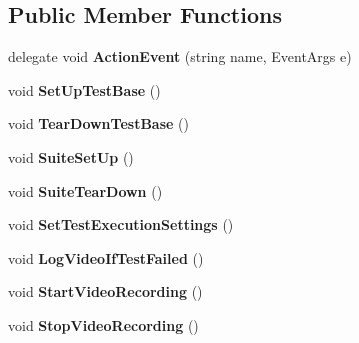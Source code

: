 \subsection*{Public Member Functions}
\begin{DoxyCompactItemize}
\item 
\hypertarget{class_proto_test_1_1_golem_1_1_core_1_1_test_base_ace5457f18ea0f9e55b5c72c79da6bdbe}{delegate void {\bfseries Action\-Event} (string name, Event\-Args e)}\label{class_proto_test_1_1_golem_1_1_core_1_1_test_base_ace5457f18ea0f9e55b5c72c79da6bdbe}

\item 
\hypertarget{class_proto_test_1_1_golem_1_1_core_1_1_test_base_a726a666bd6d11acd35645f25ca4e6694}{void {\bfseries Set\-Up\-Test\-Base} ()}\label{class_proto_test_1_1_golem_1_1_core_1_1_test_base_a726a666bd6d11acd35645f25ca4e6694}

\item 
\hypertarget{class_proto_test_1_1_golem_1_1_core_1_1_test_base_a0d44eebfd8766487426fa789e9d4533f}{void {\bfseries Tear\-Down\-Test\-Base} ()}\label{class_proto_test_1_1_golem_1_1_core_1_1_test_base_a0d44eebfd8766487426fa789e9d4533f}

\item 
\hypertarget{class_proto_test_1_1_golem_1_1_core_1_1_test_base_a65b57ce8cf0536bda33b6381b0b1eca9}{void {\bfseries Suite\-Set\-Up} ()}\label{class_proto_test_1_1_golem_1_1_core_1_1_test_base_a65b57ce8cf0536bda33b6381b0b1eca9}

\item 
\hypertarget{class_proto_test_1_1_golem_1_1_core_1_1_test_base_a8b9eaaba5027e480157df22f2ccb0abf}{void {\bfseries Suite\-Tear\-Down} ()}\label{class_proto_test_1_1_golem_1_1_core_1_1_test_base_a8b9eaaba5027e480157df22f2ccb0abf}

\item 
\hypertarget{class_proto_test_1_1_golem_1_1_core_1_1_test_base_aea47aea10e5d75939c3f0c3461f9991b}{void {\bfseries Set\-Test\-Execution\-Settings} ()}\label{class_proto_test_1_1_golem_1_1_core_1_1_test_base_aea47aea10e5d75939c3f0c3461f9991b}

\item 
\hypertarget{class_proto_test_1_1_golem_1_1_core_1_1_test_base_aa51cb306ea4a82ac7aa6100ed34f80c8}{void {\bfseries Log\-Video\-If\-Test\-Failed} ()}\label{class_proto_test_1_1_golem_1_1_core_1_1_test_base_aa51cb306ea4a82ac7aa6100ed34f80c8}

\item 
\hypertarget{class_proto_test_1_1_golem_1_1_core_1_1_test_base_ae5a94c7e8aed5e0300592276ed5cb718}{void {\bfseries Start\-Video\-Recording} ()}\label{class_proto_test_1_1_golem_1_1_core_1_1_test_base_ae5a94c7e8aed5e0300592276ed5cb718}

\item 
\hypertarget{class_proto_test_1_1_golem_1_1_core_1_1_test_base_ae73d35010ec734bf06495df8c7dd9783}{void {\bfseries Stop\-Video\-Recording} ()}\label{class_proto_test_1_1_golem_1_1_core_1_1_test_base_ae73d35010ec734bf06495df8c7dd9783}

\end{DoxyCompactItemize}
